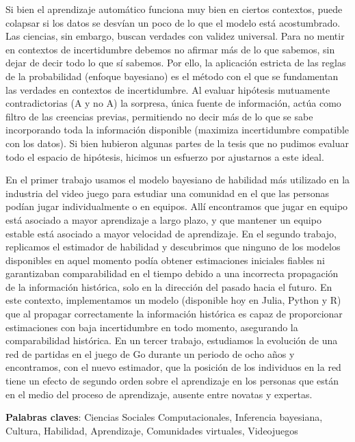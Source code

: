 \documentclass[a4paper,11pt]{book}
\theoremstyle{definition}
\begin{document}

Si bien el aprendizaje automático funciona muy bien en ciertos contextos, puede colapsar si los datos se desvían un poco de lo que el modelo está acostumbrado.
Las ciencias, sin embargo, buscan verdades con validez universal.
Para no mentir en contextos de incertidumbre debemos no afirmar más de lo que sabemos, sin dejar de decir todo lo que sí sabemos.
Por ello, la aplicación estricta de las reglas de la probabilidad (enfoque bayesiano) es el método con el que se fundamentan las verdades en contextos de incertidumbre.
Al evaluar hipótesis mutuamente contradictorias (A y no A) la sorpresa, única fuente de información, actúa como filtro de las creencias previas, permitiendo no decir más de lo que se sabe incorporando toda la información disponible (maximiza incertidumbre compatible con los datos).
Si bien hubieron algunas partes de la tesis que no pudimos evaluar todo el espacio de hipótesis, hicimos un esfuerzo por ajustarnos a este ideal.


En el primer trabajo usamos el modelo bayesiano de habilidad más utilizado en la industria del video juego para estudiar una comunidad en el que las personas podían jugar individualmente o en equipos.
Allí encontramos que jugar en equipo está asociado a mayor aprendizaje a largo plazo, y que mantener un equipo estable está asociado a mayor velocidad de aprendizaje.
En el segundo trabajo, replicamos el estimador de habilidad y descubrimos que ninguno de los modelos disponibles en aquel momento podía obtener estimaciones iniciales fiables ni garantizaban comparabilidad en el tiempo debido a una incorrecta propagación de la información histórica, solo en la dirección del pasado hacia el futuro.
En este contexto, implementamos un modelo (disponible hoy en Julia, Python y R) que al propagar correctamente la información histórica es capaz de proporcionar estimaciones con baja incertidumbre en todo momento, asegurando la comparabilidad histórica.
En un tercer trabajo, estudiamos la evolución de una red de partidas en el juego de Go durante un periodo de ocho años y encontramos, con el nuevo estimador, que la posici\'on de los individuos en la red tiene un efecto de segundo orden sobre el aprendizaje en los personas que están en el medio del proceso de aprendizaje, ausente entre novatas y expertas.

\vspace{0.1cm}

\noindent \textbf{Palabras claves}: Ciencias Sociales Computacionales, Inferencia bayesiana, Cultura, Habilidad, Aprendizaje, Comunidades virtuales, Videojuegos
\end{document}
